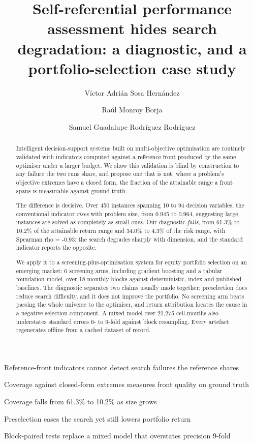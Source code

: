\documentclass[preprint,11pt,authoryear]{elsarticle}
\begin{document}
\begin{frontmatter}

\title{Self-referential performance assessment hides search degradation: a diagnostic, and a portfolio-selection case study}

\author[label1]{Víctor Adrián Sosa Hernández}
\author[label1]{Raúl Monroy Borja}
\author[label1]{Samuel Guadalupe Rodríguez Rodríguez}

\begin{abstract}
Intelligent decision-support systems built on multi-objective optimisation are routinely validated with indicators computed against a reference front produced by the same optimiser under a larger budget. We show this validation is blind by construction to any failure the two runs share, and propose one that is not: where a problem's objective extremes have a closed form, the fraction of the attainable range a front spans is measurable against ground truth.

The difference is decisive. Over 450 instances spanning 10 to 94 decision variables, the conventional indicator \emph{rises} with problem size, from 0.945 to 0.964, suggesting large instances are solved as completely as small ones. Our diagnostic \emph{falls}, from 61.3\% to 10.2\% of the attainable return range and 34.0\% to 4.3\% of the risk range, with Spearman rho = -0.93: the search degrades sharply with dimension, and the standard indicator reports the opposite.

We apply it to a screening-plus-optimisation system for equity portfolio selection on an emerging market: 6 screening arms, including gradient boosting and a tabular foundation model, over 18 monthly blocks against deterministic, index and published baselines. The diagnostic separates two claims usually made together: preselection does reduce search difficulty, and it does not improve the portfolio. No screening arm beats passing the whole universe to the optimiser, and return attribution locates the cause in a negative selection component. A mixed model over 21,275 cell-months also understates standard errors 6- to 9-fold against block resampling. Every artefact regenerates offline from a cached dataset of record.
\end{abstract}

\begin{highlights}
\item Reference-front indicators cannot detect search failures the reference shares
  \item Coverage against closed-form extremes measures front quality on ground truth
  \item Coverage falls from 61.3\% to 10.2\% as size grows
  \item Preselection eases the search yet still lowers portfolio return
  \item Block-paired tests replace a mixed model that overstates precision 9-fold
\end{highlights}


\end{frontmatter}
\end{document}

